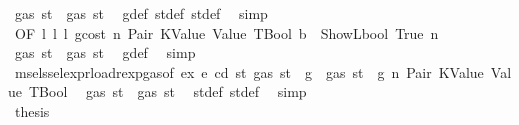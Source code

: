 \begin{isabellebody}
\ {\isachardoublequoteopen}gas\ st{}{\isacharprime}{\kern0pt}\ {\isasymle}\ gas\ st{\isacharprime}{\kern0pt}{\isacharprime}{\kern0pt}{\isacharprime}{\kern0pt}{\isachardoublequoteclose}\ \isamarkupfalse%
\ g{\isacharunderscore}{\kern0pt}def\ st{\isacharprime}{\kern0pt}{\isacharunderscore}{\kern0pt}def\ st{\isacharprime}{\kern0pt}{\isacharprime}{\kern0pt}{\isacharunderscore}{\kern0pt}def\ \isamarkupfalse%
\ simp\isanewline
\ \ \ \ \ \ \ \ \ \ \ \ \ \ \ \ \ \ \ \ \isamarkupfalse%
\ \isamarkupfalse%
\ {}{\isacharparenleft}{\kern0pt}{}{\isacharparenright}{\kern0pt}{\isacharbrackleft}{\kern0pt}OF\ l{}\ l{}\ l{}{\isacharbrackright}{\kern0pt}\ gcost\ n{}\ Pair\ KValue\ Value\ TBool\ {\isacharbackquoteopen}b\ {\isacharequal}{\kern0pt}\ ShowL\isactrlsub b\isactrlsub o\isactrlsub o\isactrlsub l\ True{\isacharbackquoteclose}\ n\ \isamarkupfalse%
\ {\isachardoublequoteopen}gas\ st{\isacharprime}{\kern0pt}{\isacharprime}{\kern0pt}{\isacharprime}{\kern0pt}\ {\isasymle}\ gas\ st{\isacharprime}{\kern0pt}{\isacharprime}{\kern0pt}{\isachardoublequoteclose}\ \isamarkupfalse%
\ g{\isacharunderscore}{\kern0pt}def\ \isamarkupfalse%
\ simp\isanewline
\ \ \ \ \ \ \ \ \ \ \ \ \ \ \ \ \ \ \ \ \isamarkupfalse%
\ \isamarkupfalse%
\ msel{\isacharunderscore}{\kern0pt}ssel{\isacharunderscore}{\kern0pt}expr{\isacharunderscore}{\kern0pt}load{\isacharunderscore}{\kern0pt}rexp{\isacharunderscore}{\kern0pt}gas{\isacharparenleft}{\kern0pt}{}{\isacharparenright}{\kern0pt}{\isacharbrackleft}{\kern0pt}of\ ex\ e\ cd\ st{\isacharprime}{\kern0pt}\ {\isachardoublequoteopen}gas\ st\ {\isacharminus}{\kern0pt}\ g{\isachardoublequoteclose}{\isacharbrackright}{\kern0pt}\ {\isacharbackquoteopen}{\isasymnot}\ gas\ st\ {\isasymle}\ g{\isacharbackquoteclose}\ n\ Pair\ KValue\ Value\ TBool\ \isamarkupfalse%
\ {\isachardoublequoteopen}gas\ st{\isacharprime}{\kern0pt}{\isacharprime}{\kern0pt}\ {\isasymle}\ gas\ st{\isacharprime}{\kern0pt}{\isachardoublequoteclose}\ \isamarkupfalse%
\ st{\isacharprime}{\kern0pt}{\isacharunderscore}{\kern0pt}def\ st{\isacharprime}{\kern0pt}{\isacharprime}{\kern0pt}{\isacharunderscore}{\kern0pt}def\ \isamarkupfalse%
\ simp\isanewline
\ \ \ \ \ \ \ \ \ \ \ \ \ \ \ \ \ \ \ \ \isamarkupfalse%
\ \isamarkupfalse%
\ {\isacharquery}{\kern0pt}thesis\ \isamarkupfalse%

\end{isabellebody}
